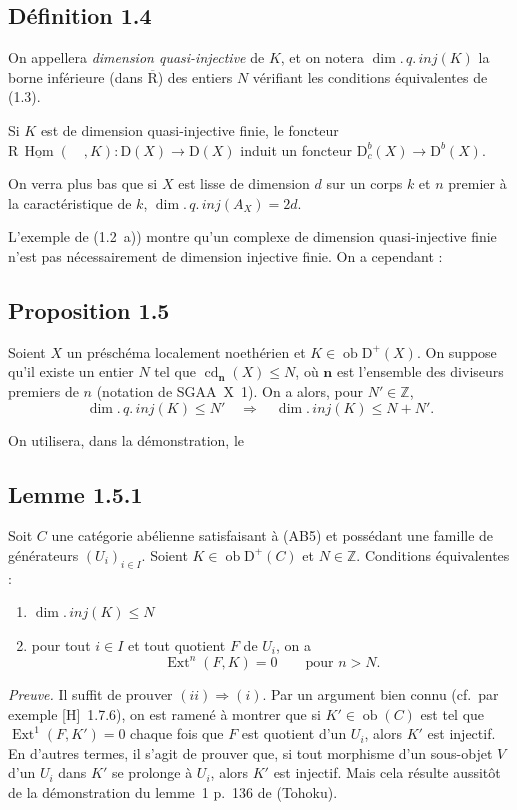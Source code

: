 \documentclass[11pt]{article}
\DeclareMathOperator{\Hom}{Hom}
\DeclareMathOperator{\Ext}{Ext}
\DeclareMathOperator{\cd}{cd}
\newcommand{\R}{\mathrm{R}}
\newcommand{\D}{\mathrm{D}}
\newcommand{\Z}{\mathbb{Z}}
\newcommand{\ob}{\operatorname{ob}}
\providecommand{\Hom}{\operatorname{Hom}}
\providecommand{\ob}{\operatorname{ob}}
\providecommand{\R}{\mathrm R}
\providecommand{\Z}{\mathbb Z}
\providecommand{\Hom}{\operatorname{Hom}}
\begin{document}
\subsection*{Définition 1.4}
On appellera \emph{dimension quasi-injective} de $K$, et on notera $\dim.\,q.\,inj(K)$ la borne inférieure (dans $\overline{\R}$) des entiers $N$ vérifiant les conditions équivalentes de (1.3).

Si $K$ est de dimension quasi-injective finie, le foncteur $\R\,\underline{\Hom}(\quad,K) : \D(X) \to \D(X)$ induit un foncteur $\D_c^{b}(X) \to \D^{b}(X)$.

On verra plus bas que si $X$ est lisse de dimension $d$ sur un corps $k$ et $n$ premier à la caractéristique de $k$, $\dim.\,q.\,inj(A_X) = 2d$.

L'exemple de (1.2~a)) montre qu'un complexe de dimension quasi-injective finie n'est pas nécessairement de dimension injective finie. On a cependant :

\subsection*{Proposition 1.5}
Soient $X$ un préschéma localement noethérien et $K \in \ob \D^{+}(X)$. On suppose qu'il existe un entier $N$ tel que $\cd_{\mathbf{n}}(X) \leqslant N$, où $\mathbf{n}$ est l'ensemble des diviseurs premiers de $n$ (notation de SGAA~X~1). On a alors, pour $N' \in \Z$,
\[
\dim.\,q.\,inj(K) \leqslant N' \quad \Longrightarrow \quad \dim.\,inj(K) \leqslant N + N'.
\]

On utilisera, dans la démonstration, le

\subsection*{Lemme 1.5.1}
Soit $C$ une catégorie abélienne satisfaisant à (AB5) et possédant une famille de générateurs $(U_i)_{i \in I}$. Soient $K \in \ob \D^{+}(C)$ et $N \in \Z$. Conditions équivalentes :
\begin{enumerate}[label=(\roman*)]
\item $\dim.\,inj(K) \leqslant N$
\item pour tout $i \in I$ et tout quotient $F$ de $U_i$, on a
\[
\Ext^n(F,K) = 0 \qquad \text{pour } n > N.
\]
\end{enumerate}

\emph{Preuve.} Il suffit de prouver $(ii) \Rightarrow (i)$. Par un argument bien connu (cf.\ par exemple [H]~1.7.6), on est ramené à montrer que si $K' \in \ob(C)$ est tel que $\Ext^1(F,K') = 0$ chaque fois que $F$ est quotient d'un $U_i$, alors $K'$ est injectif. En d'autres termes, il s'agit de prouver que, si tout morphisme d'un sous-objet $V$ d'un $U_i$ dans $K'$ se prolonge à $U_i$, alors $K'$ est injectif. Mais cela résulte aussitôt de la démonstration du lemme~1 p.~136 de (Tohoku).
\end{document}
